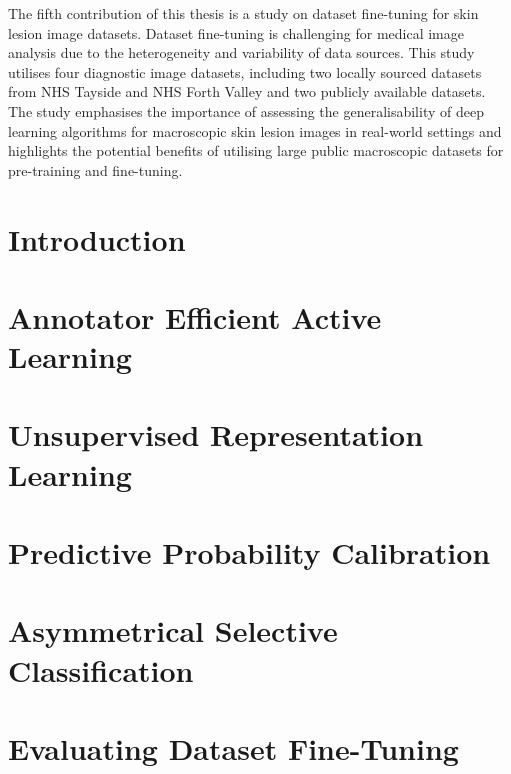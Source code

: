 \documentclass[12pt]{report}
\begin{document}
	The fifth contribution of this thesis is a study on dataset fine-tuning for skin lesion image datasets. Dataset fine-tuning is challenging for medical image analysis due to the heterogeneity and variability of data sources. This study utilises four diagnostic image datasets, including two locally sourced datasets from NHS Tayside and NHS Forth Valley and two publicly available datasets. The study emphasises the importance of assessing the generalisability of deep learning algorithms for macroscopic skin lesion images in real-world settings and highlights the potential benefits of utilising large public macroscopic datasets for pre-training and fine-tuning.
	
	
	
	\newpage
	\chapter{Introduction}
	\label{ch:introduction}
	
	
	
	\chapter{Annotator Efficient Active Learning}
	\label{ch:active_learning}
	
	
	
	\chapter{Unsupervised Representation Learning}
	\label{ch:unsupervised_representation_learning}
	
	
	
	\chapter{Predictive Probability Calibration}
	\label{ch:classification_claibration}
	
	
	
	\chapter{Asymmetrical Selective Classification}
	\label{ch:selective_classification}
	
	
	
	\chapter{Evaluating Dataset Fine-Tuning}
	\label{ch:dataset_generalisation}
	
	
\end{document}
